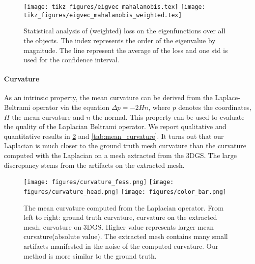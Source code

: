 \begin{figure}[ht]
    \centering
    \texttt{[image: tikz\_figures/eigvec\_mahalanobis.tex]}
    \texttt{[image: tikz\_figures/eigvec\_mahalanobis\_weighted.tex]}
    \caption{Statistical analysis of (weighted) loss on the eigenfunctions over all the objects.  The index represents the order of the eigenvalue by magnitude. The line represent the average of the loss and one std is used for the confidence interval.}
    \label{fig:eigvec}
\end{figure}

\paragraph{Curvature}\label{sub:exp:curvature}
As an intrinsic property, the mean curvature can be derived from the Laplace-Beltrami operator via the equation $\Delta p = -2Hn$, where $p$ denotes the coordinates, $H$ the mean curvature and $n$ the normal. This property can be used to evaluate the quality of the Laplacian Beltrami operator. We report qualitative and quantitative results in \cref{fig:mean_curvature} and \cref{tab:mean_curvature}. It turns out that our Laplacian is much closer to the ground truth mesh curvature than the curvature computed with the Laplacian on a mesh extracted from the 3DGS. 
The large discrepancy stems from the artifacts on the extracted mesh.
\begin{table}[ht]
    \centering
    \caption{$L_1$-error of the mean curvature computed from the Laplacian operator on an extracted mesh, point cloud, ours with Mahalanobis distance and ours with adaptive training.}
    \label{tab:mean_curvature}
\end{table}

\begin{figure}
    \centering
    \texttt{[image: figures/curvature\_fess.png]}
    \texttt{[image: figures/curvature\_head.png]}
    \texttt{[image: figures/color\_bar.png]}
    \caption{The mean curvature computed from the Laplacian operator. From left to right: ground truth curvature, curvature on the extracted mesh, curvature on 3DGS. Higher value represents larger mean curvature(absolute value). The extracted mesh contains many small artifacts manifested in the noise of the computed curvature. Our method is more similar to the ground truth.}
    \label{fig:mean_curvature}
\end{figure}

